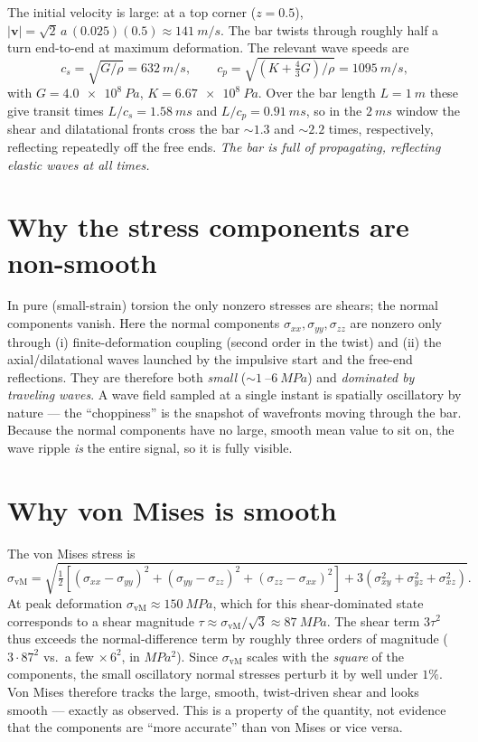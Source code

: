 \documentclass[11pt]{article}
\begin{document}
The initial velocity is large: at a top corner ($z=0.5$),
$|\mathbf v| = \sqrt{2}\,a\,(0.025)(0.5) \approx \SI{141}{m/s}$. The bar twists
through roughly half a turn end-to-end at maximum deformation. The relevant
wave speeds are
\begin{equation}
  c_s=\sqrt{G/\rho}=\SI{632}{m/s},\qquad
  c_p=\sqrt{(K+\tfrac{4}{3}G)/\rho}=\SI{1095}{m/s},
\end{equation}
with $G=\SI{4.0e8}{Pa}$, $K=\SI{6.67e8}{Pa}$. Over the bar length $L=\SI{1}{m}$
these give transit times $L/c_s=\SI{1.58}{ms}$ and $L/c_p=\SI{0.91}{ms}$, so in
the $\SI{2}{ms}$ window the shear and dilatational fronts cross the bar
$\sim\!1.3$ and $\sim\!2.2$ times, respectively, reflecting repeatedly off the
free ends. \emph{The bar is full of propagating, reflecting elastic waves at all
times.}

\section{Why the stress components are non-smooth}
In pure (small-strain) torsion the only nonzero stresses are shears; the normal
components vanish. Here the normal components $\sigma_{xx},\sigma_{yy},
\sigma_{zz}$ are nonzero only through (i) finite-deformation coupling
(second order in the twist) and (ii) the axial/dilatational waves launched by
the impulsive start and the free-end reflections. They are therefore both
\emph{small} ($\sim\!\SI{1}{}$–$\SI{6}{MPa}$) and \emph{dominated by traveling
waves}. A wave field sampled at a single instant is spatially oscillatory by
nature --- the ``choppiness'' is the snapshot of wavefronts moving through the
bar. Because the normal components have no large, smooth mean value to sit on,
the wave ripple \emph{is} the entire signal, so it is fully visible.

\section{Why von Mises is smooth}
The von Mises stress is
\begin{equation}
  \sigma_{\mathrm{vM}}
  =\sqrt{\tfrac12\!\left[(\sigma_{xx}-\sigma_{yy})^2+(\sigma_{yy}-\sigma_{zz})^2
  +(\sigma_{zz}-\sigma_{xx})^2\right]+3\!\left(\sigma_{xy}^2+\sigma_{yz}^2
  +\sigma_{xz}^2\right)}.
\end{equation}
At peak deformation $\sigma_{\mathrm{vM}}\approx\SI{150}{MPa}$, which for this
shear-dominated state corresponds to a shear magnitude
$\tau\approx\sigma_{\mathrm{vM}}/\sqrt3\approx\SI{87}{MPa}$. The shear term
$3\tau^2$ thus exceeds the normal-difference term by roughly three orders of
magnitude ($3\cdot87^2$ vs.\ a few $\times\,6^2$, in $\si{MPa^2}$). Since
$\sigma_{\mathrm{vM}}$ scales with the \emph{square} of the components, the
small oscillatory normal stresses perturb it by well under $1\%$. Von Mises
therefore tracks the large, smooth, twist-driven shear and looks smooth ---
exactly as observed. This is a property of the quantity, not evidence that the
components are ``more accurate'' than von Mises or vice versa.
\end{document}

